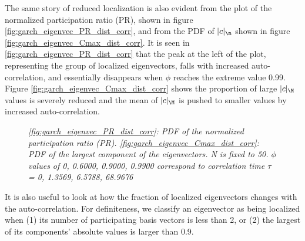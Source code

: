 The same story of reduced localization is also evident from the plot
of the normalized participation ratio (PR), shown in figure
\ref{fig:garch_eigenvec_PR_dist_corr}, and from the PDF of $|c|_\m$
shown in figure \ref{fig:garch_eigenvec_Cmax_dist_corr}. It is seen
in \ref{fig:garch_eigenvec_PR_dist_corr} that the peak at the left 
of the plot, representing the group of localized eigenvectors, falls
with increased auto-correlation, and essentially disappears when
$\phi$ reaches the extreme value 0.99. Figure
\ref{fig:garch_eigenvec_Cmax_dist_corr} shows the proportion of large
$|c|_\M$ values is severely reduced and the mean of $|c|_\M$ is pushed
to smaller values by increased auto-correlation.
\begin{figure}[htb!]
  \centering
  \caption{\small \it \ref{fig:garch_eigenvec_PR_dist_corr}: PDF of
    the normalized participation ratio
    (PR). \ref{fig:garch_eigenvec_Cmax_dist_corr}: PDF of the largest
    component of the eigenvectors. N is fixed to 50. $\phi$ values of
    0, 0.6000, 0.9000, 0.9900 correspond to correlation time $\tau$ =
    0, 1.3569, 6.5788, 68.9676}
\end{figure}

It is also useful to look at how the fraction of localized eigenvectors
changes with the auto-correlation. For definiteness, we classify
an eigenvector as being localized when (1) its number of participating
basis vectors is less than 2, or (2) the largest of its components'
absolute values is larger than 0.9.

